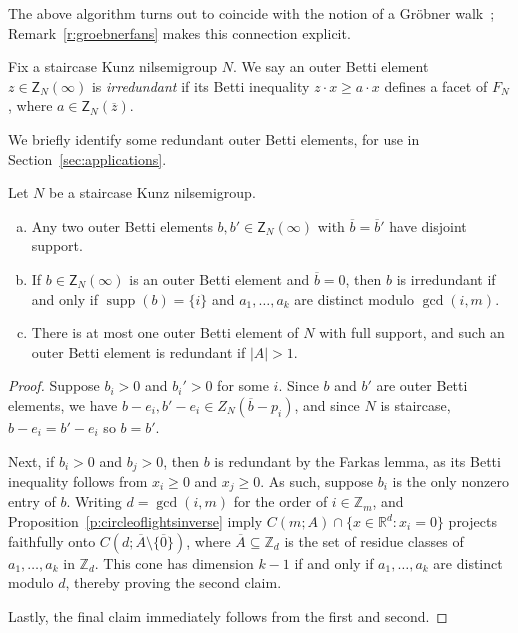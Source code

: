 \documentclass[ALCO, Unicode]{cedram}
\newcommand\ZZ{\mathbb{Z}}
\newcommand\RR{\mathbb{R}}
\DeclareMathOperator\supp{supp}
\begin{document}
The above algorithm turns out to coincide with the notion of a Gr\"obner walk~\cite{gfanpaper}; Remark~\ref{r:groebnerfans} makes this connection explicit.  



\begin{defi}\label{d:irredundantinequality}
Fix a staircase Kunz nilsemigroup $N$.  We say an outer Betti element $z \in \mathsf Z_N(\infty)$ is \emph{irredundant} if its Betti inequality $z \cdot x \ge a \cdot x$ defines a facet of $F_N$, where $a \in \mathsf Z_N(\overline z)$.  
\end{defi}

We briefly identify some redundant outer Betti elements, for use in Section~\ref{sec:applications}.  

\begin{prop}\label{p:reduandantbettis}
Let $N$ be a staircase Kunz nilsemigroup.  
\begin{enumerate}[(a)]
\item 
Any two outer Betti elements $b, b' \in \mathsf Z_N(\infty)$ with $\overline b = \overline b'$ have disjoint support.  

\item 
If $b \in \mathsf Z_N(\infty)$ is an outer Betti element and $\overline b = 0$, then $b$ is irredundant if and only if $\supp(b) = \{i\}$ and $a_1, \ldots, a_k$ are distinct modulo $\gcd(i,m)$.  

\item 
There is at most one outer Betti element of $N$ with full support, and such an outer Betti element is redundant if $|A| > 1$.  

\end{enumerate}
\end{prop}

\begin{proof}
Suppose $b_i > 0$ and $b_i' > 0$ for some $i$.  Since $b$ and $b'$ are outer Betti elements, we have $b - e_i, b' - e_i \in Z_N(\overline b - p_i)$, and since $N$ is staircase, $b - e_i = b' - e_i$ so $b = b'$.  

Next, if $b_i > 0$ and $b_j > 0$, then $b$ is redundant by the Farkas lemma, as its Betti inequality follows from $x_i \ge 0$ and $x_j \ge 0$.  As such, suppose $b_i$ is the only nonzero entry of $b$.  Writing $d = \gcd(i,m)$ for the order of $i \in \ZZ_m$, \cite[Corollary~3.7]{kunzfaces1} and Proposition~\ref{p:circleoflightsinverse} imply $C(m; A) \cap \{x \in \RR^d : x_i = 0\}$ projects faithfully onto $C(d; \overline A \setminus \{\overline 0\})$, where $\overline A \subseteq \ZZ_d$ is the set of residue classes of $a_1, \ldots, a_k$ in $\ZZ_d$.  This cone has dimension $k-1$ if and only if $a_1, \ldots, a_k$ are distinct modulo $d$, thereby proving the second claim.  

Lastly, the final claim immediately follows from the first and second.  
\end{proof}
\end{document}
